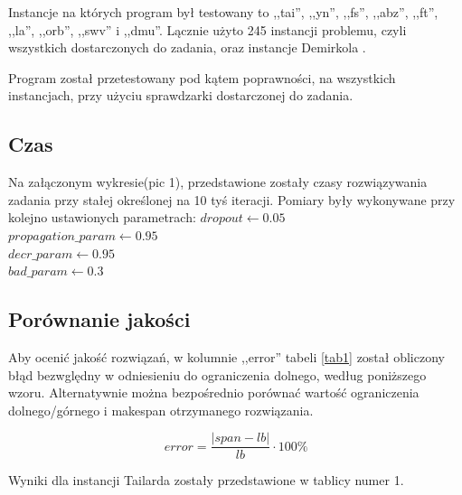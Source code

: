 \documentclass[11pt,twocolumn]{article}
\begin{document}
Instancje na których program był testowany to ,,tai'', ,,yn'', ,,fs'',
,,abz'', ,,ft'', ,,la'', ,,orb'', ,,swv'' i ,,dmu''.
Lącznie użyto 245 instancji problemu,
czyli wszystkich dostarczonych do zadania,
oraz instancje Demirkola \cite{bound}.

Program został przetestowany pod kątem poprawności,
na wszystkich instancjach,
przy użyciu sprawdzarki dostarczonej do zadania.

\subsection{Czas}

Na załączonym wykresie(pic 1), przedstawione zostały czasy rozwiązywania zadania przy stałej określonej na 10 tyś iteracji.
Pomiary były wykonywane przy kolejno ustawionych parametrach:
$dropout \longleftarrow 0.05$ \\
$propagation\_param \longleftarrow 0.95$ \\
$decr\_param \longleftarrow 0.95$ \\
$bad\_param \longleftarrow 0.3$ \\


\subsection{Porównanie jakości}

Aby ocenić jakość rozwiązań, w kolumnie ,,error'' tabeli \ref{tab1}
został obliczony błąd bezwględny w odniesieniu do ograniczenia dolnego,
według poniższego wzoru.
Alternatywnie można bezpośrednio porównać wartość ograniczenia dolnego/górnego
i makespan otrzymanego rozwiązania.

$$ error = \frac{|span - lb|}{lb} \cdot 100\% $$

Wyniki dla instancji Tailarda zostały przedstawione w tablicy numer 1.
\end{document}
